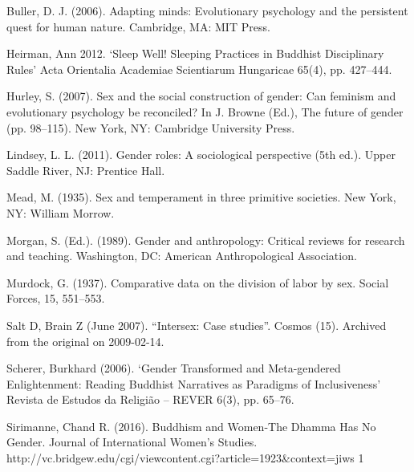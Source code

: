 Buller, D. J. (2006). Adapting minds: Evolutionary psychology and the persistent quest for human nature. Cambridge, MA: MIT Press.

Heirman, Ann 2012. ‘Sleep Well! Sleeping Practices in Buddhist Disciplinary Rules’ Acta Orientalia Academiae Scientiarum Hungaricae 65(4), pp. 427–444.

Hurley, S. (2007). Sex and the social construction of gender: Can feminism and evolutionary psychology be reconciled? In J. Browne (Ed.), The future of gender (pp. 98–115). New York, NY: Cambridge University Press.

Lindsey, L. L. (2011). Gender roles: A sociological perspective (5th ed.). Upper Saddle River, NJ: Prentice Hall.

Mead, M. (1935). Sex and temperament in three primitive societies. New York, NY: William Morrow.

Morgan, S. (Ed.). (1989). Gender and anthropology: Critical reviews for research and teaching. Washington, DC: American Anthropological Association.

Murdock, G. (1937). Comparative data on the division of labor by sex. Social Forces, 15, 551–553.

Salt D, Brain Z (June 2007). “Intersex: Case studies”. Cosmos (15). Archived from the original on 2009-02-14.

Scherer, Burkhard (2006). ‘Gender Transformed and Meta-gendered Enlightenment: Reading Buddhist Narratives as Paradigms of Inclusiveness’ Revista de Estudos da Religião – REVER 6(3), pp. 65–76.

Sirimanne, Chand R. (2016). Buddhism and Women-The Dhamma Has No Gender. Journal of International Women’s Studies.
http://vc.bridgew.edu/cgi/viewcontent.cgi?article=1923&context=jiws 1


